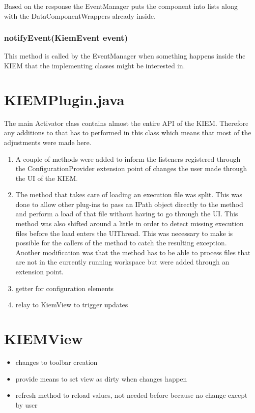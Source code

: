 Based on the response the EventManager puts the component into lists along with the DataComponentWrappers
already inside.
\subsubsection*{notifyEvent(KiemEvent event)}
This method is called by the EventManager when something happens inside the \ac{KIEM} that the implementing
classes might be interested in.



\section{KIEMPlugin.java}
The main Activator class contains almost the entire \ac{API} of the \ac{KIEM}.
Therefore any additions to that has to performed in this class which means that
most of the adjustments were made here.


\begin{enumerate}
 \item A couple of methods were added to inform the listeners registered through
the ConfigurationProvider extension point of changes the user made through the \ac{UI} of the \ac{KIEM}.
 \item The method that takes care of loading an execution file was split. This was done to allow
other plug-ins to pass an IPath object directly to the method and perform a load of that file without
having to go through the \ac{UI}. This method was also shifted around a little in order to detect
missing execution files before the load enters the UIThread. This was necessary to make is possible for
the callers of the method to catch the resulting exception.
Another modification was that the method has to be able to process files that are not in the currently
running workspace but were added through an extension point.
 \item getter for configuration elements
 \item relay to KiemView to trigger updates
\end{enumerate}

\section{KIEMView}
\begin{itemize}
 \item changes to toolbar creation
 \item provide means to set view as dirty when changes happen
 \item refresh method to reload values, not needed before because no change except by user
\end{itemize}